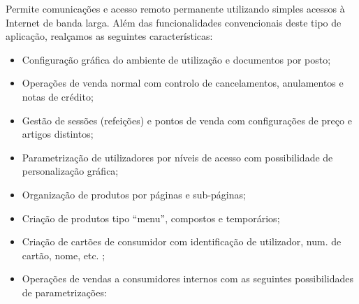 \documentclass[a4paper,11pt,openany]{memoir}
\begin{document}
Permite comunicações e acesso remoto permanente utilizando simples acessos à Internet de banda larga.
Além das funcionalidades convencionais deste tipo de aplicação, realçamos as seguintes características:
\begin{itemize}
\item Configuração gráfica do ambiente de utilização e documentos por posto;
\item Operações de venda normal com controlo de cancelamentos, anulamentos e notas de crédito;
\item Gestão de sessões (refeições) e pontos de venda com configurações de preço e artigos distintos;
\item Parametrização de utilizadores por níveis de acesso com possibilidade de personalização gráfica;
\item Organização de produtos por páginas e sub-páginas;

\item Criação de produtos tipo “menu”, compostos e temporários;

\item Criação de cartões de consumidor com identificação de utilizador, num. de cartão, nome, etc. ;

\item Operações de vendas a consumidores internos com as seguintes possibilidades de parametrizações:


\end{itemize}
\end{document}
